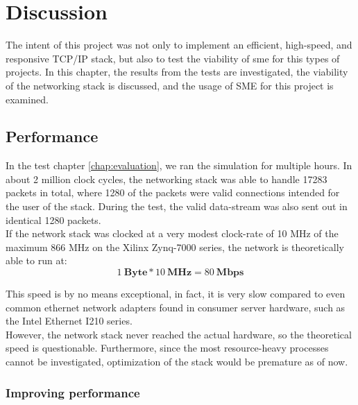\chapter{Discussion}
\label{chap:discussion}
The intent of this project was not only to implement an efficient, high-speed,
and responsive TCP/IP stack, but also to test the viability of \gls{sme} for
this types of projects. In this chapter, the results from the tests are
investigated, the viability of the networking stack is discussed, and the usage
of SME for this project is examined.


\section{Performance}
In the test chapter \ref{chap:evaluation}, we ran the simulation for
multiple hours. In about 2 million clock cycles, the networking stack was able
to handle 17283 packets in total, where 1280 of the packets were valid
connections intended for the user of the stack. During the test, the valid
data-stream was also sent out in identical 1280 packets.\\ %
If the network stack was clocked at a very modest clock-rate of 10 MHz of the
maximum 866 MHz on the Xilinx Zynq-7000 series\cite{xilinx_zynq_7000}, the
network is theoretically able to run at:
$$1\:\mathbf{Byte}*10\:\mathbf{MHz}= 80\:\mathbf{Mbps}$$

This speed is by no means exceptional, in fact, it is very slow compared
to even common ethernet network adapters found in consumer server hardware, such
as the Intel Ethernet I210 series\cite{intel_1gbps_nic}.\\

However, the network stack never reached the actual hardware, so the
theoretical speed is questionable. Furthermore, since the most resource-heavy
processes cannot be investigated, optimization of the stack would be premature
as of now.




\subsection{Improving performance}


